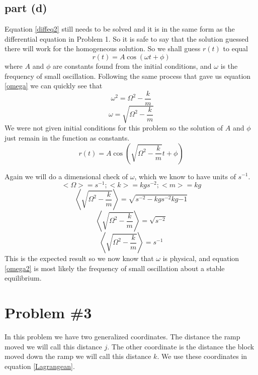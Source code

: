 \documentclass[11pt]{article}
\numberwithin{equation}{section}
\begin{document}
\subsection{part (d)}
Equation \ref{diffeq2} still needs to be solved and it is in the same form as the differential equation in Problem 1. So it is safe to say that the solution guessed there will work for the homogeneous solution. So we shall guess $r(t)$ to equal 
$$r(t) = A\cos{(\omega t + \phi)}$$
where $A$ and $\phi$ are constants found from the initial conditions, and $\omega$ is the frequency of small oscillation. Following the same process that gave us equation \ref{omega} we can quickly see that 
$$\omega^2 = \Omega^2 - \frac{k}{m}$$
\begin{equation}
\omega = \sqrt{\Omega^2 - \frac{k}{m}}
\label{omega2}
\end{equation}
We were not given initial conditions for this problem so the solution of $A$ and $\phi$ just remain in the function as constants.
\begin{equation}
r(t) = A\cos{(\sqrt{\Omega^2 - \frac{k}{m}} t + \phi)}
\label{EqMot2} 
\end{equation}

Again we will do a dimensional check of $\omega$, which we know to have units of $s^{-1}$.
$$<\Omega> = s^{-1}; <k> = kg s^{-2}; <m> = kg$$ 
$$ \left<\sqrt{\Omega^2 - \frac{k}{m}}\right> = \sqrt{s^{-2} - kg s^{-2} kg{-1}}$$
$$ \left<\sqrt{\Omega^2 - \frac{k}{m}}\right> = \sqrt{s^{-2}}$$
$$ \left<\sqrt{\Omega^2 - \frac{k}{m}}\right> = s^{-1}$$
This is the expected result so we now know that $\omega$ is physical, and equation \ref{omega2} is most likely the frequency of small oscillation about a stable equilibrium.
\begin{center}
\end{center}

\section{Problem \#3}
In this problem we have two generalized coordinates. The distance the ramp moved
we will call this distance $j$. The other coordinate is the distance the block moved down the ramp we will call this distance $k$. We use these coordinates in equation \ref{Lagrangean}. 
\end{document}

